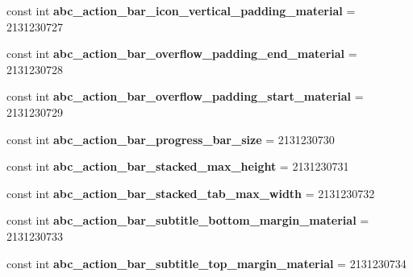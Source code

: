 \begin{DoxyCompactItemize}
\item 
\mbox{\label{classst_delivery_1_1_resource_1_1_dimension_a750ed49aff33d64bca12d8815bd45c60}} 
const int {\bfseries abc\+\_\+action\+\_\+bar\+\_\+icon\+\_\+vertical\+\_\+padding\+\_\+material} = 2131230727
\item 
\mbox{\label{classst_delivery_1_1_resource_1_1_dimension_a59c2ee3785cab6bf1006dc29841e584e}} 
const int {\bfseries abc\+\_\+action\+\_\+bar\+\_\+overflow\+\_\+padding\+\_\+end\+\_\+material} = 2131230728
\item 
\mbox{\label{classst_delivery_1_1_resource_1_1_dimension_adc82159f5b4aeb26c92f4cb16a01e2c9}} 
const int {\bfseries abc\+\_\+action\+\_\+bar\+\_\+overflow\+\_\+padding\+\_\+start\+\_\+material} = 2131230729
\item 
\mbox{\label{classst_delivery_1_1_resource_1_1_dimension_a7a5a1ff64c4108051a911f27807f26ee}} 
const int {\bfseries abc\+\_\+action\+\_\+bar\+\_\+progress\+\_\+bar\+\_\+size} = 2131230730
\item 
\mbox{\label{classst_delivery_1_1_resource_1_1_dimension_acf36b3d4565b3d2d43346c272ea6822a}} 
const int {\bfseries abc\+\_\+action\+\_\+bar\+\_\+stacked\+\_\+max\+\_\+height} = 2131230731
\item 
\mbox{\label{classst_delivery_1_1_resource_1_1_dimension_a1461acf75853736023b49c765423ee18}} 
const int {\bfseries abc\+\_\+action\+\_\+bar\+\_\+stacked\+\_\+tab\+\_\+max\+\_\+width} = 2131230732
\item 
\mbox{\label{classst_delivery_1_1_resource_1_1_dimension_a1fcabfd7b7e6ba3b8f4bd10efe82fbb4}} 
const int {\bfseries abc\+\_\+action\+\_\+bar\+\_\+subtitle\+\_\+bottom\+\_\+margin\+\_\+material} = 2131230733
\item 
\mbox{\label{classst_delivery_1_1_resource_1_1_dimension_a024b0c8a8127f1d937b85a98ab808cce}} 
const int {\bfseries abc\+\_\+action\+\_\+bar\+\_\+subtitle\+\_\+top\+\_\+margin\+\_\+material} = 2131230734

\end{DoxyCompactItemize}
